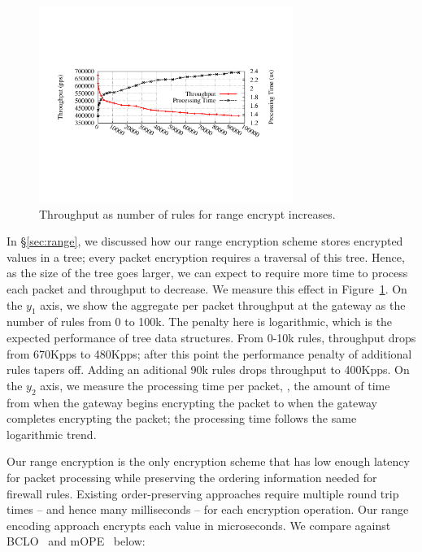 \begin{figure}[t]
  \includegraphics[width=3.25in]{fig/xputrange}
  \vspace{-10pt}
  \caption[]{\label{fig:xputrange} Throughput as number of rules for range encrypt increases.}
  \vspace{-10pt}
\end{figure}

In \S\ref{sec:range}, we discussed how our range encryption scheme stores encrypted values in a tree; every packet encryption requires a traversal of this tree.
Hence, as the size of the tree goes larger, we can expect to require more time to process each packet and throughput to decrease.
We measure this effect in Figure~\ref{fig:xputrange}. 
On the $y_1$ axis, we show the aggregate per packet throughput at the gateway as the number of rules from 0 to 100k. The penalty here is logarithmic, which is the expected performance of tree data structures. From 0-10k rules, throughput drops from 670Kpps to 480Kpps; after this point the performance penalty of additional rules tapers off. Adding an aditional 90k rules drops throughput to 400Kpps.
On the $y_2$ axis, we measure the processing time per packet, \ie{}, the amount of time from when the gateway begins encrypting the packet to when the gateway completes encrypting the packet; the processing time follows the same logarithmic trend.

Our range encryption is the only encryption scheme that has low enough latency for packet processing while preserving the ordering information needed for firewall rules. 
Existing order-preserving approaches require multiple round trip times -- and hence many milliseconds -- for each encryption operation.
Our range encoding approach encrypts each value in microseconds.
We compare against BCLO~\cite{boldyreva:ope} and mOPE~\cite{popa:mope} below:


